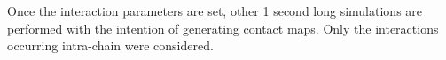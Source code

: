 
Once the interaction parameters are set, other 1 second long simulations are performed with the intention of generating contact maps. Only the interactions occurring intra-chain were considered. 






